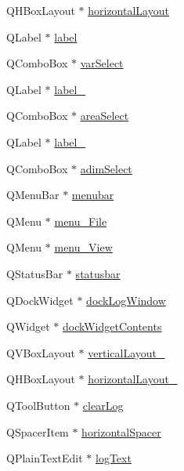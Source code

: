 \begin{DoxyCompactItemize}
\item 
Q\+H\+Box\+Layout $\ast$ \mbox{\hyperlink{class_ui___ts_editor_window_a692644cebc07b77667885ab993360132}{horizontal\+Layout}}
\item 
Q\+Label $\ast$ \mbox{\hyperlink{class_ui___ts_editor_window_a2da6b5d23b11d320e5ee619613432076}{label}}
\item 
Q\+Combo\+Box $\ast$ \mbox{\hyperlink{class_ui___ts_editor_window_acc3d4013f6c49a1149107ec61bf673f6}{var\+Select}}
\item 
Q\+Label $\ast$ \mbox{\hyperlink{class_ui___ts_editor_window_a6423eacb57ef96646ae8949c9aae436e}{label\+\_}}
\item 
Q\+Combo\+Box $\ast$ \mbox{\hyperlink{class_ui___ts_editor_window_a96c47856b850aee1a83ca59367ff8ff4}{area\+Select}}
\item 
Q\+Label $\ast$ \mbox{\hyperlink{class_ui___ts_editor_window_ae2dee6b38f7507ca84a3b842225a2326}{label\+\_}}
\item 
Q\+Combo\+Box $\ast$ \mbox{\hyperlink{class_ui___ts_editor_window_aa8c59e66aa46a91943fa7c4d325ded95}{adim\+Select}}
\item 
Q\+Menu\+Bar $\ast$ \mbox{\hyperlink{class_ui___ts_editor_window_aaf00cddd6c4642644a277c64ae600cba}{menubar}}
\item 
Q\+Menu $\ast$ \mbox{\hyperlink{class_ui___ts_editor_window_a70738b14af7a4b5c1aac655bba0e0f98}{menu\+\_\+\+File}}
\item 
Q\+Menu $\ast$ \mbox{\hyperlink{class_ui___ts_editor_window_a065d77f97b2c7e3a8d7330b221363e1b}{menu\+\_\+\+View}}
\item 
Q\+Status\+Bar $\ast$ \mbox{\hyperlink{class_ui___ts_editor_window_ae411796e37b7ac7cf90d7466c9332e3a}{statusbar}}
\item 
Q\+Dock\+Widget $\ast$ \mbox{\hyperlink{class_ui___ts_editor_window_a1f0031caeca1afe4f22532b999d72492}{dock\+Log\+Window}}
\item 
Q\+Widget $\ast$ \mbox{\hyperlink{class_ui___ts_editor_window_a29c8648b11170fc5406f291fb1a8e18f}{dock\+Widget\+Contents}}
\item 
Q\+V\+Box\+Layout $\ast$ \mbox{\hyperlink{class_ui___ts_editor_window_a5a4624c461d3d90bf158a26382b6ec52}{vertical\+Layout\+\_}}
\item 
Q\+H\+Box\+Layout $\ast$ \mbox{\hyperlink{class_ui___ts_editor_window_a31e71e7f79a16cc2db305f55e2bb8a23}{horizontal\+Layout\+\_}}
\item 
Q\+Tool\+Button $\ast$ \mbox{\hyperlink{class_ui___ts_editor_window_a3d4d89d64aefe4ddb377c1f2401c8b5f}{clear\+Log}}
\item 
Q\+Spacer\+Item $\ast$ \mbox{\hyperlink{class_ui___ts_editor_window_a70218d8a27046278c77ff5339dca2102}{horizontal\+Spacer}}
\item 
Q\+Plain\+Text\+Edit $\ast$ \mbox{\hyperlink{class_ui___ts_editor_window_abcab8f0cf60fde26669a338e24c4445d}{log\+Text}}
\end{DoxyCompactItemize}


